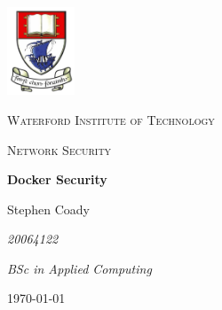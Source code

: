\begin{titlepage}
	\centering
	\includegraphics[width=0.15\textwidth]{components/images/wit}\par\vspace{1cm}
	{\scshape\LARGE Waterford Institute of Technology \par}
	\vspace{1cm}
	{\scshape\Large Network Security\par}
	\vspace{1.5cm}
	{\huge\bfseries Docker Security\par}
	\vspace{2cm}
	{\Large Stephen Coady\par}
	{\Large\itshape 20064122\par}	
	{\Large\itshape BSc in Applied Computing\par}


	\vfill

	{\large \today\par}
\end{titlepage}
